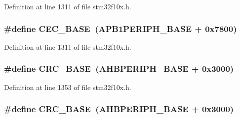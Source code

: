 Definition at line 1311 of file stm32f10x.\+h.

\subsubsection[{\texorpdfstring{C\+E\+C\+\_\+\+B\+A\+SE}{CEC_BASE}}]{\setlength{\rightskip}{0pt plus 5cm}\#define C\+E\+C\+\_\+\+B\+A\+SE~({\bf A\+P\+B1\+P\+E\+R\+I\+P\+H\+\_\+\+B\+A\+SE} + 0x7800)}\hypertarget{group___peripheral__memory__map_gaacb77bc44b3f8c87ab98f241e760e440}{}\label{group___peripheral__memory__map_gaacb77bc44b3f8c87ab98f241e760e440}


Definition at line 1311 of file stm32f10x.\+h.

\subsubsection[{\texorpdfstring{C\+R\+C\+\_\+\+B\+A\+SE}{CRC_BASE}}]{\setlength{\rightskip}{0pt plus 5cm}\#define C\+R\+C\+\_\+\+B\+A\+SE~({\bf A\+H\+B\+P\+E\+R\+I\+P\+H\+\_\+\+B\+A\+SE} + 0x3000)}\hypertarget{group___peripheral__memory__map_ga656a447589e785594cbf2f45c835ad7e}{}\label{group___peripheral__memory__map_ga656a447589e785594cbf2f45c835ad7e}


Definition at line 1353 of file stm32f10x.\+h.

\subsubsection[{\texorpdfstring{C\+R\+C\+\_\+\+B\+A\+SE}{CRC_BASE}}]{\setlength{\rightskip}{0pt plus 5cm}\#define C\+R\+C\+\_\+\+B\+A\+SE~({\bf A\+H\+B\+P\+E\+R\+I\+P\+H\+\_\+\+B\+A\+SE} + 0x3000)}\hypertarget{group___peripheral__memory__map_ga656a447589e785594cbf2f45c835ad7e}{}\label{group___peripheral__memory__map_ga656a447589e785594cbf2f45c835ad7e}



